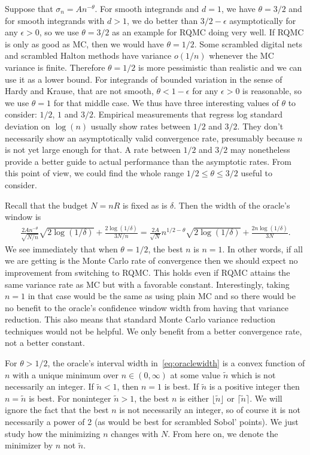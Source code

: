\documentclass{article}
\renewcommand{\le}{\leqslant}
\begin{document}
Suppose that $\sigma_n = An^{-\theta}$.  For smooth integrands
and $d=1$, we have $\theta=3/2$ and for smooth integrands with $d>1$, we do better than $3/2-\epsilon$ asymptotically for any $\epsilon>0$, so we use $\theta=3/2$ as an example for RQMC doing very well. If RQMC is only as good as MC, then we would have $\theta=1/2$. Some scrambled digital nets and scrambled Halton methods have variance $o(1/n)$ whenever the MC variance is finite. Therefore $\theta=1/2$ is more pessimistic than realistic and we can use it as a lower bound. For integrands of bounded
variation in the sense of Hardy and Krause, that are not smooth, $\theta<1-\epsilon$ for any $\epsilon>0$ is reasonable, so we use $\theta=1$ for that middle case.  We thus have three interesting values of $\theta$ to consider: $1/2$, $1$ and $3/2$.  Empirical measurements that regress log standard deviation on $\log(n)$ usually show rates between $1/2$ and $3/2$.  They don't necessarily show an asymptotically valid convergence rate, presumably because $n$ is not yet large enough for that.  A rate between $1/2$ and $3/2$ may nonetheless provide a better guide to actual performance than the asymptotic rates. From this point of view, we could find the whole range $1/2\le \theta\le3/2$ useful to consider.

Recall that the budget $N=nR$ is fixed as is $\delta$.
Then the width  of the oracle's window is
\begin{align}\label{eq:oraclewidth}
\frac{2An^{-\theta}}{\sqrt{N/n}}\sqrt{2\log(1/\delta)}  + \frac{2\log(1/\delta)}{3N/n}
=\frac{2A}{\sqrt{N}}n^{1/2-\theta}\sqrt{2\log(1/\delta)}  + \frac{2n\log(1/\delta)}{3N}.
\end{align}
We see immediately that when $\theta = 1/2$, the best $n$ is $n=1$. In other words, if all we are getting is the Monte Carlo rate of convergence then we should expect no improvement from switching to RQMC.  This holds even if RQMC attains the same variance rate as MC but with a favorable constant.  Interestingly, taking $n=1$ in that case would be the same as using plain MC and so there would be no benefit to the oracle's confidence window width from having that variance reduction.  This also means that standard Monte Carlo variance reduction techniques would not be helpful.  We only benefit from a better convergence rate, not a better constant.

For $\theta>1/2$, the oracle's interval width in~\eqref{eq:oraclewidth} is a convex function of $n$ with a unique minimum over $n\in(0,\infty)$ at some value $\tilde n$ which is not necessarily an integer.  
If $\tilde n<1$, then $n=1$ is best.  If $\tilde n$ is a positive
integer then $n=\tilde n$ is best. For noninteger $\tilde n >1$,
the best $n$ is either $\lfloor \tilde n\rfloor$
or  $\lceil \tilde n\rceil$.  We will ignore the fact that the best $n$ is not
necessarily an integer, so of course it is not necessarily a power of 2 (as would be best for scrambled Sobol' points). We just study how the minimizing $n$ changes with $N$.  From here on, we denote the minimizer by $n$ not $\tilde n$.
\end{document}
